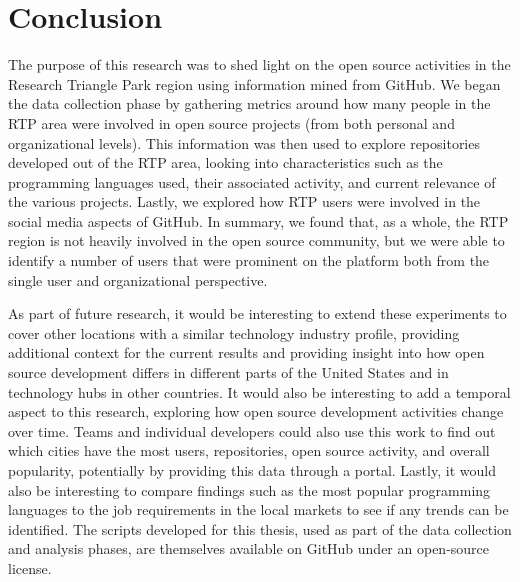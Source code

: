 \chapter{Conclusion}
\label{Chapter:Conclusion}

The purpose of this research was to shed light on the open source activities in the Research Triangle Park region using information mined from  GitHub. We began the data collection phase by gathering metrics around how many people in the RTP area were involved in open source projects (from both personal and organizational levels). This information was then used to explore repositories developed out of the RTP area, looking into characteristics such as the programming languages used, their associated activity, and current relevance of the various projects. Lastly, we explored how RTP users were involved in the social media aspects of GitHub. In summary, we found that, as a whole, the RTP region is not heavily involved in the open source community, but we were able to identify a number of users that were prominent on the platform both from the single user and organizational perspective.

As part of future research, it would be interesting to extend these experiments to cover other locations with a similar technology industry profile, providing additional context for the current results and providing insight into how open source development differs in different parts of the United States and in technology hubs in other countries. It would also be interesting to add a temporal aspect to this research, exploring how open source development activities change over time. Teams and individual developers could also use this work to find out which cities have the most users, repositories, open source activity, and overall popularity, potentially by providing this data through a portal. Lastly, it would also be interesting to compare findings such as the most popular programming languages to the job requirements in the local markets to see if any trends can be identified. The scripts developed for this thesis, used as part of the data collection and analysis phases, are themselves available on GitHub under an open-source license.
